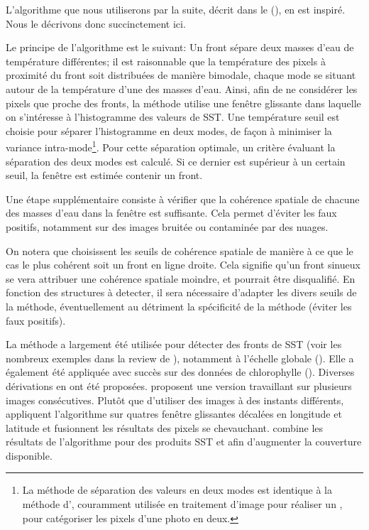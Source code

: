 \begin{technique}
L'algorithme que nous utiliserons par la suite, décrit dans le  (), en est inspiré. Nous le décrivons donc succinctement ici.

Le principe de l'algorithme  est le suivant: Un front sépare deux masses d'eau de température différentes; il est raisonnable que la température des pixels à proximité du front soit distribuées de manière bimodale, chaque mode se situant autour de la température d'une des masses d'eau.
Ainsi, afin de ne considérer les pixels que proche des fronts, la méthode utilise une fenêtre glissante dans laquelle on s'intéresse à l'histogramme des valeurs de SST.
Une température seuil est choisie pour séparer l'histogramme en deux modes, de façon à minimiser la variance intra-mode\footnote{%
  La méthode de séparation des valeurs en deux modes est identique à la méthode d'\textcite{otsu_1979}, couramment utilisée en traitement d'image pour réaliser un ,  pour catégoriser les pixels d'une photo en deux.
}.
Pour cette séparation optimale, un critère évaluant la séparation des deux modes est calculé. Si ce dernier est supérieur à un certain seuil, la fenêtre est estimée contenir un front.

Une étape supplémentaire consiste à vérifier que la cohérence spatiale de chacune des masses d'eau dans la fenêtre est suffisante.
Cela permet d'éviter les faux positifs, notamment sur des images bruitée ou contaminée par des nuages.

  On notera que \textcite{cayula_1992} choisissent les seuils de cohérence spatiale de manière à ce que le cas le plus cohérent soit un front en ligne droite.
  Cela signifie qu'un front sinueux se vera attribuer une cohérence spatiale moindre, et pourrait être disqualifié.
  En fonction des structures à detecter, il sera nécessaire d'adapter les divers seuils de la méthode, éventuellement au détriment la spécificité de la méthode (éviter les faux positifs).

\end{technique}

La méthode  a largement été utilisée pour détecter des fronts de SST (voir les nombreux exemples dans la review de \cite{belkin_2021}), notamment à l'échelle globale (\cite{belkin_2009a,belkin_2007}).
Elle a également été appliquée avec succès sur des données de chlorophylle (\cite{stegmann_2004,kahru_2012,bontempi_2004}).
Diverses dérivations en ont été proposées.
\textcite{cayula_1995} proposent une version travaillant sur plusieurs images consécutives.
Plutôt que d'utiliser des images à des instants différents, \textcite{nieto_2012} appliquent l'algorithme  sur quatres fenêtre glissantes décalées en longitude et latitude et fusionnent les résultats des pixels se chevauchant.
\textcite{miller_2009} combine les résultats de l'algorithme  pour des produits SST et  afin d'augmenter la couverture disponible.

